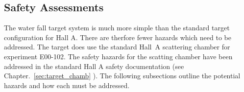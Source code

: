 \begin{safetyen}{0}{0}
\section{Safety Assessments}
\end{safetyen}

\begin{safetyen}{50}{50}
The water fall target system is much more simple than the standard
target configuration for Hall A. There are therfore fewer hazards
which need to be addressed. The target does use the standard Hall~A 
scattering chamber for experiment E00-102. The safety hazards for
the scatting chamber have been addressed in the standard Hall A safety
documentation (see Chapter.~\ref{sec:target_chamb}%
). 
The following subsections outline the potential hazards
and how each must be addressed.
\end{safetyen}


